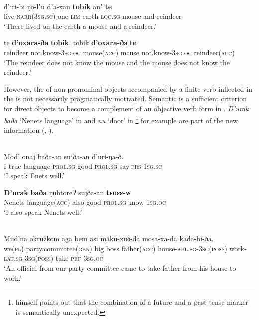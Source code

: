 \documentclass[output=paper]{LSP/langsci}
\begin{document}
\ea \label{12-wr-ex:30}
\\
\ea\label{12-wr-ex:30a}
\gll dʼiri-bi ŋo-lʼu dʼa-xan \textbf{tobik} anʼ \textbf{te}\\
live\textsc{-narr(3sg.sc)} one-\textsc{lim} earth\textsc{-loc.sg} mouse and reindeer\\
\glt ‘There lived on the earth a mouse and a reindeer.’

\ex\label{12-wr-ex:30b}
\gll te \textbf{d'oxara-ða} \textbf{tobik}, tobik \textbf{d'oxara-ða} \textbf{te}\\
reindeer not.know\textsc{-3sg.oc} mouse(\textsc{acc)} mouse not.know-\textsc{3sg.oc} reindeer(\textsc{acc)}\\
\glt ‘The reindeer does not know the mouse and the mouse does not know the reindeer.’
\z
\z

However, the  of non-pronominal objects accompanied by a finite verb inflected in the  is not necessarily pragmatically motivated. Semantic  is a sufficient criterion for direct objects to become a complement of an objective verb form in . \textit{D’urak baða} ‘Nenets language’ in  and \textit{nu} ‘door’ in \footnote{\citet[490]{Siegl2013Materials} himself points out that the combination of a future and a past tense marker is semantically unexpected.}
 for example are part of the new information (\cf {}, ). 

\ea \label{12-wr-ex:31}
\\

\ea \label{12-wr-ex:31a}
\gll Mod’ onaj baða-an sujða-an d’uri-ŋa-ð.\\
 I true language-\textsc{prol.sg} good\textsc{-prol.sg} say\textsc{-prs-1sg.sc}\\
\glt  ‘I speak Enets well.’

\ex  \label{12-wr-ex:31b}
\gll \textbf{D'urak}  \textbf{baða} ŋubtoreɁ sujða-an \textbf{tɛnɛɛ-w}\\
 Nenets language(\textsc{acc)} also good\textsc{-prol.sg} know\textsc{-1sg.oc}\\
\glt  ‘I also speak Nenets well.’
\z
\z

\ea\label{12-wr-ex:32}
\\
\ea\label{12-wr-ex:32a}
\gll Mud’na okružkom aga bem äsi mäku-xuð-da mosa-xa-da kada-bi-ða.\\
 we(\textsc{pl)} party.committee(\textsc{gen)} big boss father(\textsc{acc)} house-\textsc{abl.sg-3sg(poss)} work-\textsc{lat.sg-3sg(poss)} take\textsc{-prf-3sg.oc}\\
\glt ‘An official from our party committee came to take father from his house to work.’
\end{document}
